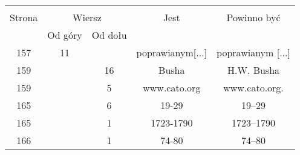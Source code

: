 \documentclass[a4paper,11pt]{article}
\begin{document}
\begin{center}

  \begin{tabular}{|c|c|c|c|c|}
    \hline
    & \multicolumn{2}{c|}{} & & \\
    Strona & \multicolumn{2}{c|}{Wiersz} & Jest
                              & Powinno być \\ \cline{2-3}
    & Od góry & Od dołu & & \\
    \hline
    157 & 11 & & poprawianym[...] & poprawianym [...] \\
    159 & & 16 & Busha & H.W. Busha \\
    159 & &  5 & www.cato.org & www.cato.org. \\
    165 & &  6 & 19-29 & 19--29 \\
    165 & &  1 & 1723-1790 & 1723--1790 \\
    166 & &  1 & 74-80 & 74--80 \\
    \hline
  \end{tabular}



\end{center}
\end{document}
